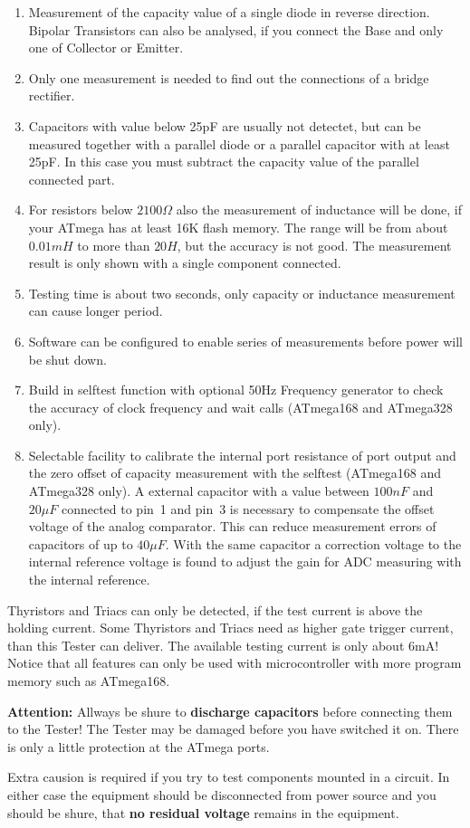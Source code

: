 \begin{enumerate}
\item Measurement of the capacity value of a single diode in reverse direction.
Bipolar Transistors can also be analysed, if you connect the Base and only one of Collector or Emitter.
\item Only one measurement is needed to find out the connections of a bridge rectifier.
\item Capacitors with value below 25pF are usually not detectet, but can be measured together with
a parallel diode or a parallel capacitor with at least 25pF.
In this case you must subtract the capacity value of the parallel connected part.
\item For resistors below \(2100 \Omega\) also the measurement of inductance will be done, if
your ATmega has at least 16K flash memory.
The range will be from about \(0.01 mH\) to more than \(20 H\), but the accuracy is not good.
The measurement result is only shown with a single component connected.
\item Testing time is about two seconds, only capacity or inductance measurement can cause longer period.
\item Software can be configured to enable series of measurements before power will be shut down.
\item Build in selftest function with optional 50Hz Frequency generator to check the accuracy of clock frequency and wait calls (ATmega168 and ATmega328 only).
\item Selectable facility to calibrate the internal port resistance of port output and
the zero offset of capacity measurement with the selftest (ATmega168 and ATmega328 only).
A external capacitor with a value between \(100 nF\) 
and \(20 \mu F\) connected to pin~1 and pin~3 is necessary to compensate the offset voltage of the analog comparator.
This can reduce measurement errors of capacitors of up to \(40 \mu F\).
With the same capacitor a correction voltage to the internal reference voltage is found to adjust the
gain for ADC measuring with the internal reference.
\end{enumerate}

Thyristors and Triacs can only be detected, if the test current is above the holding current.
Some Thyristors and Triacs need as higher gate trigger current, than this Tester can deliver.
The available testing current is only about 6mA!
Notice that all features can only be used with microcontroller with more program memory such as ATmega168.

\vspace{1cm}
\textbf{{\Large Attention:}} Allways be shure to {\bf discharge capacitors} before connecting them to the Tester!
The Tester may be damaged before you have switched it on. There is only a little protection at the ATmega ports.

Extra causion is required if you try to test components mounted in a circuit.
In either case the equipment should be disconnected from power source and you should be shure,
that {\bf no residual voltage} remains in the equipment.

